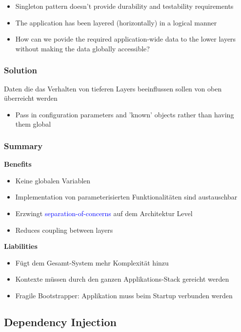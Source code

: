 \begin{itemize}
    \item Singleton pattern doesn't provide durability and testability requirements
    \item The application has been layered (horizontally) in a logical manner
    \item How can we povide the required application-wide data to the lower layers without making the data globally accessible?
\end{itemize}

\subsubsection{Solution}
Daten die das Verhalten von tieferen Layers beeinflussen sollen von oben überreicht werden

\begin{itemize}
    \item Pass in configuration parameters and 'known' objects rather than having them global
\end{itemize}
\subsubsection{Summary}
\textbf{Benefits}
\begin{itemize}
    \item Keine globalen Variablen
    \item Implementation von parameterisierten Funktionalitäten sind austauschbar
    \item Erzwingt \textcolor{blue}{separation-of-concerns} auf dem Architektur Level
    \item Reduces coupling between layers
\end{itemize}
\vspace{10pt}
\textbf{Liabilities}
\begin{itemize}
    \item Fügt dem Gesamt-System mehr Komplexität hinzu
    \item Kontexte müssen durch den ganzen Applikations-Stack gereicht werden
    \item Fragile Bootstrapper: Applikation muss beim Startup verbunden werden
\end{itemize}

\vfill\null
\columnbreak

\subsection{Dependency Injection}

